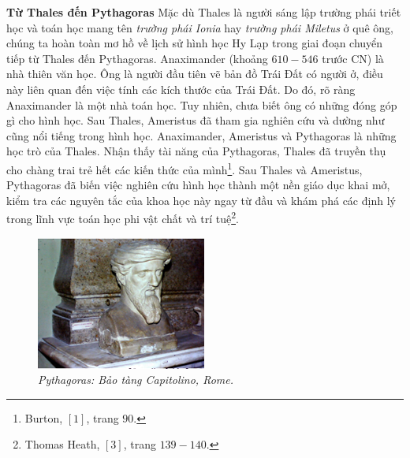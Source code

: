 \begin{multicols}{2}
	\textbf{\color{lichsutoanhoc}Từ Thales đến Pythagoras}
	\vskip 0.05cm 
	Mặc dù Thales là người sáng lập trường phái triết học và toán học mang tên \textit{trường phái Ionia} hay \textit{trường phái Miletus} ở quê ông, chúng ta hoàn toàn mơ hồ về lịch sử hình học Hy Lạp trong giai đoạn chuyển tiếp từ Thales đến Pythagoras. Anaximander (khoảng $610-546$ trước CN) là nhà thiên văn học. Ông là người đầu tiên vẽ bản đồ Trái Đất có người ở, điều này liên quan đến việc tính các kích thước của Trái Đất. Do đó, rõ ràng Anaximander là một nhà toán học. Tuy nhiên, chưa biết ông có những đóng góp gì cho hình học. Sau Thales, Ameristus đã tham gia nghiên cứu và dường như cũng nổi tiếng trong hình học. Anaximander, Ameristus và Pythagoras là những học trò của Thales. Nhận thấy tài năng của Pythagoras, Thales đã truyền thụ cho chàng trai trẻ hết các kiến thức của mình\footnote[2]{\color{lichsutoanhoc}Burton, $[1]$, trang $90$.}.
	\vskip 0.05cm 
	Sau Thales và Ameristus, Pythagoras đã biến việc nghiên cứu hình học thành một nền giáo dục khai mở, kiểm tra các nguyên tắc của khoa học này ngay từ đầu và khám phá các định lý trong lĩnh vực toán học phi vật chất và trí tuệ\footnote[3]{\color{lichsutoanhoc}Thomas Heath, $[3]$, trang $139-140$.}.
	\begin{figure}[H]
		\vspace*{5pt}
		\centering
		\captionsetup{labelformat= empty, justification=centering}
		\includegraphics[width= 1\linewidth]{1}
		\caption{\small\textit{\color{lichsutoanhoc}Pythagoras: Bảo tàng Capitolino, Rome.}}
		\vspace*{-15pt}

\end{figure}
\end{multicols}
